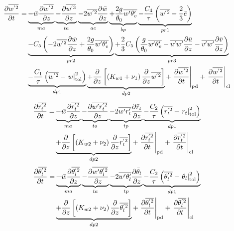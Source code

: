\documentclass[11pt,fleqn]{article}
\newcommand{\ptlder}[2]{\frac{\partial #1}{\partial #2}}
\begin{document}
\begin{equation}
\label{eq_wp2}
\begin{split}
\ptlder{\overline{w^{'2}}}{t} 
=& \underbrace{ - \bar{w}\ptlder{\overline{w^{'2}}}{z} }_{ma}
   \underbrace{ - \ptlder{\overline{w^{'3}}}{z} }_{ta}
   \underbrace{ - 2\overline{w^{'2}}\ptlder{\bar{w}}{z} }_{ac}
   \underbrace{ + \frac{2g}{\theta_0} \overline{w'\theta'_v} }_{bp}
   \underbrace{ - \frac{C_4}{\tau} \left( \overline{w^{'2}} -\frac{2}{3}\bar{e} \right) }_{pr1} \\
 & \underbrace{ - C_5 
     \left(
       - 2\overline{w^{'2}}\ptlder{\bar{w}}{z}
       + \frac{2g}{\theta_0} \overline{w'\theta'_v}
     \right) }_{pr2}
   \underbrace{ + \frac{2}{3} C_5
     \left(
       \frac{g}{\theta_0} \overline{w'\theta'_v} 
       - \overline{u'w'}\ptlder{\bar{u}}{z} 
       - \overline{v'w'}\ptlder{\bar{v}}{z} 
     \right) }_{pr3} \\
 & \underbrace{ - \dfrac{C_1}{\tau} \left(   \overline{w^{'2}} 
                              - \left. w \right|_{\rm{tol}}^{2} \right) }_{dp1}
   \underbrace{ + \ptlder{}{z} \left[ \left( K_{w1} + \nu_1 \right)
                         \ptlder{}{z} \overline{w^{'2}} 
                  \right] }_{dp2}
   + \left. \ptlder{\overline{w^{'2}}}{t} \right|_{\rm{pd}}
   + \left. \ptlder{\overline{w^{'2}}}{t} \right|_{\rm{cl}}
\end{split}
\end{equation}
%
\begin{equation}
\label{eq_rtp2}
\begin{split}
\ptlder{\overline{r_t^{'2}}}{t}
=& \underbrace{ - \bar{w}\ptlder{\overline{r^{'2}_t}}{z} }_{ma}
   \underbrace{ - \ptlder{\overline{w'r_t^{'2}}}{z} }_{ta}
   \underbrace{ - 2\overline{w'r'_t}\ptlder{\bar{r}_t}{z} }_{tp}
   \underbrace{ - \dfrac{C_2}{\tau} \left(   \overline{r_t^{'2}} 
                              - \left. r_t \right|_{\rm{tol}}^{2} \right) }_{dp1} \\
 & \underbrace{ + \ptlder{}{z} \left[ \left( K_{w2} + \nu_2 \right)
                         \ptlder{}{z} \overline{r_t^{'2}} 
                  \right] }_{dp2}
   + \left. \ptlder{\overline{r_t^{'2}}}{t} \right|_{\rm{pd}}
   + \left. \ptlder{\overline{r_t^{'2}}}{t} \right|_{\rm{cl}}
\end{split}
\end{equation}
%
\begin{equation}
\label{eq_thlp2}
\begin{split}
\ptlder{\overline{\theta_l^{'2}}}{t}
=& \underbrace{ - \bar{w}\ptlder{\overline{\theta^{'2}_l}}{z} }_{ma}
   \underbrace{ - \ptlder{\overline{w'\theta_l^{'2}}}{z} }_{ta}
   \underbrace{ - 2\overline{w'\theta'_l}\ptlder{\bar{\theta}_l}{z} }_{tp}
   \underbrace{ - \dfrac{C_2}{\tau} \left(   \overline{\theta_l^{'2}} 
                              - \left. \theta_l \right|_{\rm{tol}}^{2} \right) }_{dp1} \\
 & \underbrace{ + \ptlder{}{z} \left[ \left( K_{w2} + \nu_2 \right)
                         \ptlder{}{z} \overline{\theta_l^{'2}}
                  \right] }_{dp2}
   + \left. \ptlder{\overline{\theta_l^{'2}}}{t} \right|_{\rm{pd}}
   + \left. \ptlder{\overline{\theta_l^{'2}}}{t} \right|_{\rm{cl}}
\end{split}
\end{equation}
\end{document}
